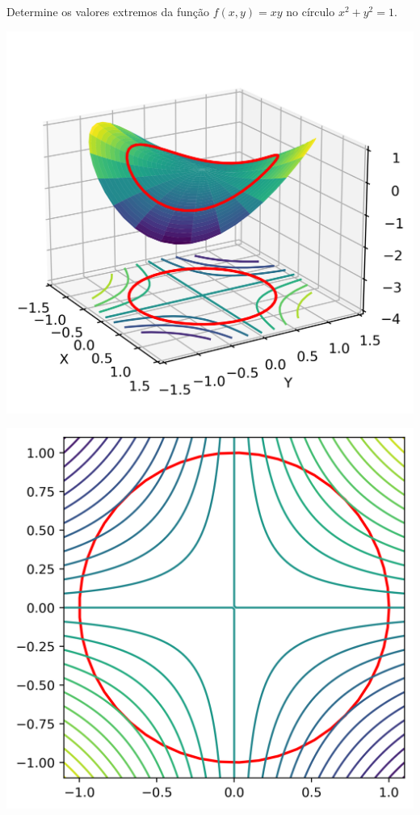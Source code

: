 \begin{frame}[label=otimizacao]
\begin{exe}
Determine os valores extremos da função $f(x,y)=xy$ no círculo $x^2+y^2=1$.
\end{exe}

\begin{minipage}{0.55\textwidth}
\includegraphics[scale=.6]{figuras/exemplo-lagrange1.png}
\end{minipage}
\begin{minipage}{0.4\textwidth}
\includegraphics[scale=.45]{figuras/exemplo-lagrange-curvas-nivel.png}
\end{minipage}
\end{frame}

